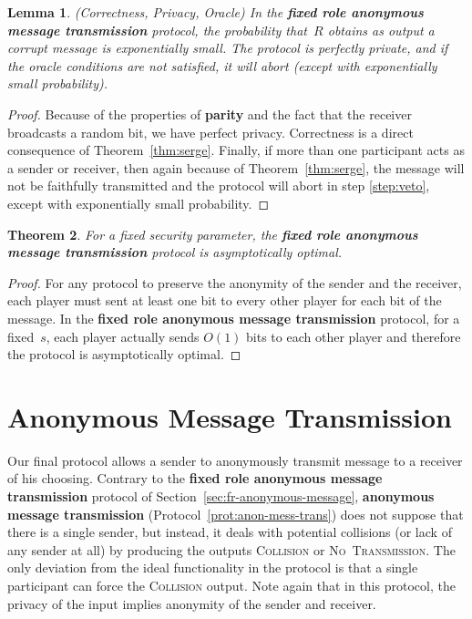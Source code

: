 \documentclass[11pt]{article}
\newtheorem{theorem}{Theorem}[section]
\newtheorem{lemma}[theorem]{Lemma}
\begin{document}
\begin{lemma}(Correctness, Privacy, Oracle)
In the \textbf{fixed role anonymous message transmission} protocol,
the probability that~$R$ obtains as output a corrupt message is
exponentially small. The protocol is perfectly private,  and  if the
oracle conditions are not satisfied, it will abort (except with
exponentially small probability).
\end{lemma}

\begin{proof}
Because of the properties of \textbf{parity} and the fact that the
receiver broadcasts a random bit, we have perfect privacy.
Correctness is a direct consequence of Theorem~\ref{thm:serge}.
Finally, if more than one participant acts as a sender or
receiver, then again because of Theorem~\ref{thm:serge}, the message
will not be faithfully transmitted and the protocol will abort in
step \ref{step:veto}, except with  exponentially small probability.
\end{proof}

\begin{theorem} \label{thm:optimal}
For a fixed security parameter, the \textbf{fixed role anonymous
message transmission} protocol is asymptotically optimal.
\end{theorem}

\begin{proof}
For any protocol to preserve the anonymity of the sender and the
receiver,  each player must sent at least one bit to every other
player for each bit of the message. In the  \textbf{fixed role
anonymous message transmission} protocol, for a fixed~$s$,  each
player actually sends $O(1)$ bits to each other player and therefore
the protocol is asymptotically optimal.
\end{proof}


\section{Anonymous Message Transmission}
\label{sec:anonymous-message}


Our final protocol allows a sender to anonymously transmit
message to a receiver of his choosing. Contrary to  the
\textbf{fixed role anonymous message transmission} protocol of
Section~\ref{sec:fr-anonymous-message}, \textbf{anonymous message
transmission} (Protocol~\ref{prot:anon-mess-trans}) does not suppose
that there is a single sender, but instead, it deals with potential
collisions (or lack of any sender at all) by producing the outputs
\textsc{Collision} or \textsc{No~Transmission}. The only deviation
from the ideal functionality in the  protocol is that a single
participant can force the \textsc{Collision} output. Note again that
in this protocol, the privacy of the input implies anonymity of the
sender and receiver.
\end{document}
